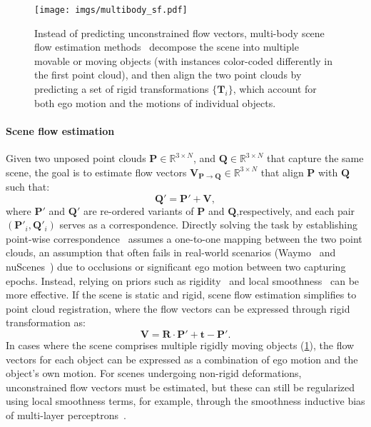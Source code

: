 \begin{figure}[t]
    \centering
    \texttt{[image: imgs/multibody\_sf.pdf]}
    \caption{Instead of predicting unconstrained flow vectors, multi-body scene flow estimation methods~\cite{huang2022dynamic,gojcic2021weakly,zhu2023living} decompose the scene into multiple movable or moving objects (with instances color-coded differently in the first point cloud), and then align the two point clouds by predicting a set of rigid transformations $\{\mathbf{T}_i\}$, which account for both ego motion and the motions of individual objects.}
    \label{fig:bg_multibody_sf}
\end{figure}

\paragraph{Scene flow estimation}
Given two unposed point clouds $\mathbf{P} \in \mathbb{R}^{3 \times N} $, and $\mathbf{Q} \in \mathbb{R}^{3 \times N}$ that capture the same scene, the goal is to estimate flow vectors $\mathbf{V}_{\mathbf{P} \rightarrow \mathbf{Q}} \in \mathbb{R}^{3 \times N}$ that align $\mathbf{P}$ with $\mathbf{Q}$ such that:
\begin{equation}
    \mathbf{Q}' = \mathbf{P}' + \mathbf{V},
\end{equation}
where $\mathbf{P}'$ and $\mathbf{Q}'$ are re-ordered variants of $\mathbf{P}$ and $\mathbf{Q}$,respectively, and each pair $(\mathbf{P}'_i, \mathbf{Q}'_i)$ serves as a correspondence. Directly solving the task by establishing point-wise correspondence~\cite{wu2019pointpwc} assumes a one-to-one mapping between the two point clouds, an assumption that often fails in real-world scenarios (\eg Waymo~\cite{sun2020scalability} and nuScenes~\cite{caesar2020nuscenes}) due to occlusions or significant ego motion between two capturing epochs. Instead, relying on priors such as rigidity~\cite{gojcic2021weakly} and local smoothness~\cite{li2020neural} can be more effective. If the scene is static and rigid, scene flow estimation simplifies to point cloud registration, where the flow vectors can be expressed through rigid transformation as:
\begin{equation}
    \mathbf{V} = \mathbf{R}\cdot \mathbf{P}' + \mathbf{t} - \mathbf{P}'.
\end{equation}
In cases where the scene comprises multiple rigidly moving objects (\cf \cref{fig:bg_multibody_sf}), the flow vectors for each object can be expressed as a combination of ego motion and the object's own motion. For scenes undergoing non-rigid deformations, unconstrained flow vectors must be estimated, but these can still be regularized using local smoothness terms, for example, through the smoothness inductive bias of multi-layer perceptrons~\cite{li2020neural,li2023fast}.


